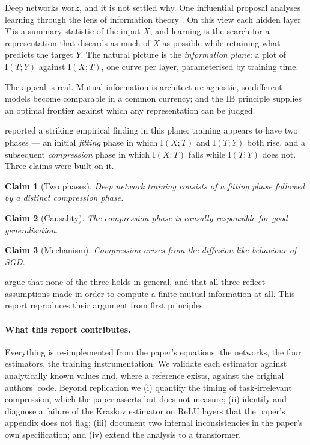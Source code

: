 \documentclass[11pt,a4paper]{article}
\newcommand{\I}{\mathrm{I}}
\newtheorem{claim}{Claim}
\begin{document}
Deep networks work, and it is not settled why. One influential proposal analyses
learning through the lens of information theory
\citep{tishby2015deep,shwartzziv2017opening}. On this view each hidden layer $T$
is a summary statistic of the input $X$, and learning is the search for a
representation that discards as much of $X$ as possible while retaining what
predicts the target $Y$. The natural picture is the \emph{information plane}: a
plot of $\I(T;Y)$ against $\I(X;T)$, one curve per layer, parameterised by
training time.

The appeal is real. Mutual information is architecture-agnostic, so different
models become comparable in a common currency; and the IB principle
\citep{tishby1999information} supplies an optimal frontier against which any
representation can be judged.

\citet{shwartzziv2017opening} reported a striking empirical finding in this
plane: training appears to have two phases --- an initial \emph{fitting} phase in
which $\I(X;T)$ and $\I(T;Y)$ both rise, and a subsequent \emph{compression}
phase in which $\I(X;T)$ falls while $\I(T;Y)$ does not. Three claims were built
on it.

\begin{claim}[Two phases]\label{cl:phases}
Deep network training consists of a fitting phase followed by a distinct
compression phase.
\end{claim}
\begin{claim}[Causality]\label{cl:cause}
The compression phase is causally responsible for good generalisation.
\end{claim}
\begin{claim}[Mechanism]\label{cl:mech}
Compression arises from the diffusion-like behaviour of SGD.
\end{claim}

\citet{saxe2019information} argue that none of the three holds in general, and
that all three reflect assumptions made in order to compute a finite mutual
information at all. This report reproduces their argument from first principles.

\paragraph{What this report contributes.}
Everything is re-implemented from the paper's equations: the networks, the four
estimators, the training instrumentation. We validate each estimator against
analytically known values and, where a reference exists, against the original
authors' code. Beyond replication we (i) quantify the timing of task-irrelevant
compression, which the paper asserts but does not measure; (ii) identify and
diagnose a failure of the Kraskov estimator on ReLU layers that the paper's
appendix does not flag; (iii) document two internal inconsistencies in the
paper's own specification; and (iv) extend the analysis to a transformer.
\end{document}
